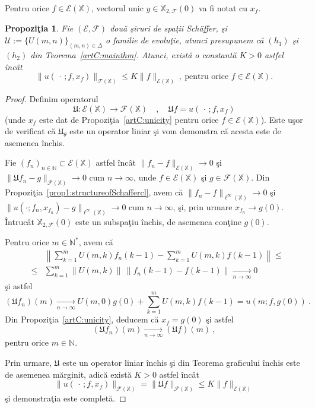 \documentclass[ a4paper, 12pt]{report}
\newcommand{\E}{\mathcal{E}}
\newcommand{\F}{\mathcal{F}}
\newcommand{\N}{\mathbb{N}}
\newcommand{\X}{\mathbb{X}}
\newtheorem{prop}[theorem]{\bf Propozi\c tia }
\theoremstyle{definition}
\theoremstyle{remark}
\numberwithin{equation}{section}
\begin{document}
Pentru orice $f\in\E(\X)$, vectorul unic $y\in\X_{2,\F}(0)$ va fi notat cu $x_{f}$.


\begin{prop}
\label{artC:boundedness}
Fie $(\E,\F)$ dou\u a \c siruri de spa\c tii Sch\"{a}ffer, \c si $\mathcal{U}:=\{U(m,n)\}_{(m,n)\in\Delta}$ o familie de evolu\c tie, atunci presupunem c\u a $(h_1)$ \c si $(h_2)$ din Teorema~\ref{artC:mainthm}. Atunci, exist\u a o constant\u a $K>0$ astfel \^inc\^at
$$\|u(\,\cdot\,;f,x_f)\|_{\F(\X)}\leq K\|f\|_{\E(\X)}\ ,\ \text{pentru orice } f\in\E(\X).$$
\end{prop}
\begin{proof}
Definim operatorul
$$\mathfrak{U}:\E(\X)\to\F(\X)\quad,\quad
  \mathfrak{U}f=u(\,\cdot\,;f,x_{f}) $$
(unde $x_f$ este dat de Propozi\c tia~\ref{artC:unicity} pentru orice $f\in\E(\X)$).
Este u\c sor de verificat c\u a $\mathfrak{U}_{\theta}$ este un operator liniar \c si
vom demonstra c\u a acesta este de asemenea \^inchis.

Fie $(f_n)_{n\in\N}\subset\E(\X)$ astfel \^inc\^at
$\|f_n-f\|_{\E(\X)}\to0$ \c si
$\|\mathfrak{U}f_n-g\|_{\F(\X)}\to0$ cum $n\to\infty$, unde
$f\in\E(\X)$ \c si $g\in\F(\X)$. Din Propozi\c tia~\ref{prop1:structureofSchaffercl}, avem c\u a
$\|f_n-f\|_{\ell^{\infty}(\X)}\to0$ \c si
$\|u(\cdot;f_n,x_{f_n})-g\|_{\ell^{\infty}(\X)}\to0$ cum $n\to\infty$,
\c si, prin urmare
$x_{f_n}\to g(0)$. \^Intruc\^at $\X_{2,\F}(0)$ este un subspa\c tiu \^inchis, de asemenea con\c tine $g(0)$.

Pentru orice $m\in\N^*$, avem c\u a
\begin{eqnarray*}
&&\left\|\sum_{k=1}^{m}U(m,k)f_n(k-1) - \sum_{k=1}^{m}U(m,k)f(k-1) \right\| \leq \\
 &\leq&\sum_{k=1}^{m} \|U(m,k)\|\,\|f_n(k-1)-f(k-1)\| \xrightarrow[n\to\infty]{}0
 \end{eqnarray*}
\c si astfel
$$(\mathfrak{U}f_n)(m) \xrightarrow[n\to\infty]{} U(m,0)g(0) + \sum_{k=1}^{m}U(m,k)f(k-1)= u(m;f,g(0))\ .$$
Din Propozi\c tia~\ref{artC:unicity}, deducem c\u a $x_f=g(0)$ \c si astfel
$$(\mathfrak{U}f_n)(m) \xrightarrow[n\to\infty]{} (\mathfrak{U}f)(m)\ ,$$
pentru orice $m\in\N$.

Prin urmare, $\mathfrak{U}$ este un operator liniar \^inchis \c si din
Teorema graficului \^inchis  este de asemenea m\u arginit, adic\u a exist\u a
$K>0$ astfel \^inc\^at
$$\|u(\,\cdot\,;f,x_{f})\|_{\F(\X)}=
  \|\mathfrak{U}f\|_{\F(\X)}\leq   K\|f\|_{\E(\X)}$$
\c si demonstra\c tia este complet\u a.
\end{proof}
\end{document}
